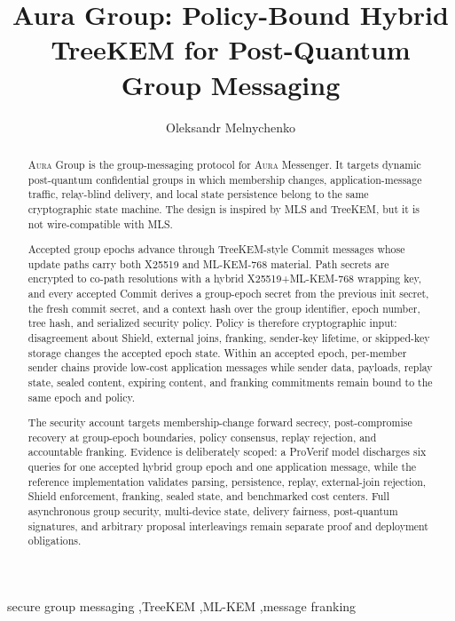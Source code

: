\documentclass[preprint,12pt]{elsarticle}
\date{}
\theoremstyle{definition}
\newcommand{\tech}[1]{\textnormal{#1}}
\newcommand{\Aura}{\textsc{Aura}}
\newcommand{\MLS}{\tech{MLS}}
\newcommand{\TreeKEM}{\tech{TreeKEM}}
\newcommand{\Shield}{\tech{Shield}}
\newcommand{\ProVerif}{\tech{ProVerif}}
\renewcommand{\DH}{\tech{X25519}}
\newcommand{\KEM}{\tech{ML-KEM-768}}
\begin{document}
\begin{frontmatter}

\title{Aura Group: Policy-Bound Hybrid TreeKEM for Post-Quantum Group Messaging}

\author{Oleksandr Melnychenko}

\address{Khmelnytskyi National University, Khmelnytskyi, Ukraine}


\begin{abstract}
\Aura{} Group is the group-messaging protocol for \Aura{} Messenger. It
targets dynamic post-quantum confidential groups in which membership changes,
application-message traffic, relay-blind delivery, and local state persistence
belong to the same cryptographic state machine. The design is inspired by
\MLS{} and \TreeKEM{}, but it is not wire-compatible with MLS.

Accepted group epochs advance through \TreeKEM{}-style Commit messages whose
update paths carry both \DH{} and \KEM{} material. Path secrets are encrypted
to co-path resolutions with a hybrid \DH{}+\KEM{} wrapping key, and every
accepted Commit derives a group-epoch secret from the previous init secret,
the fresh commit secret, and a context hash over the group identifier, epoch
number, tree hash, and serialized security policy. Policy is therefore
cryptographic input: disagreement about \Shield{}, external joins, franking,
sender-key lifetime, or skipped-key storage changes the accepted epoch state.
Within an accepted epoch, per-member sender chains provide low-cost
application messages while sender data, payloads, replay state, sealed
content, expiring content, and franking commitments remain bound to the same
epoch and policy.

The security account targets membership-change forward secrecy,
post-compromise recovery at group-epoch boundaries, policy consensus, replay
rejection, and accountable franking. Evidence is deliberately scoped: a
\ProVerif{} model discharges six queries for one accepted hybrid group epoch
and one application message, while the reference implementation validates
parsing, persistence, replay, external-join rejection, \Shield{} enforcement,
franking, sealed state, and benchmarked cost centers. Full asynchronous group
security, multi-device state, delivery fairness, post-quantum signatures, and
arbitrary proposal interleavings remain separate proof and deployment
obligations.
\end{abstract}

\begin{keyword}
secure group messaging \sep TreeKEM \sep ML-KEM \sep message franking
\end{keyword}

\end{frontmatter}
\end{document}
